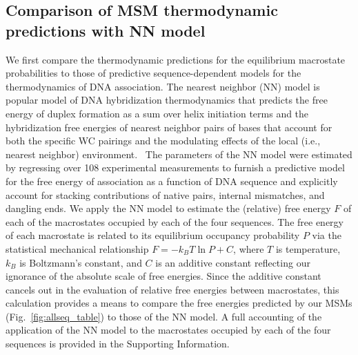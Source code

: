 \documentclass[journal=jpcbfk,manuscript=article]{achemso}
\begin{document}
\subsection{Comparison of MSM thermodynamic predictions with NN model} \label{sec:NN}

We first compare the thermodynamic predictions for the equilibrium macrostate probabilities to those of predictive sequence-dependent models for the thermodynamics of DNA association. The nearest neighbor (NN) model is popular model of DNA hybridization thermodynamics that predicts the free energy of duplex formation as a sum over helix initiation terms and the hybridization free energies of nearest neighbor pairs of bases that account for both the specific WC pairings and the modulating effects of the local (i.e., nearest neighbor) environment.~\citep{SantaLucia1998AThermodynamics, Santalucia2004TM} The parameters of the NN model were estimated by regressing over 108 experimental measurements to furnish a predictive model for the free energy of association as a function of DNA sequence and explicitly account for stacking contributions of native pairs, internal mismatches, and dangling ends. We apply the NN model to estimate the (relative) free energy $F$ of each of the macrostates occupied by each of the four sequences. The free energy of each macrostate is related to its equilibrium occupancy probability $P$ via the statistical mechanical relationship $F = -k_B T \ln P + C$, where $T$ is temperature, $k_B$ is Boltzmann's constant, and $C$ is an additive constant reflecting our ignorance of the absolute scale of free energies. Since the additive constant cancels out in the evaluation of relative free energies between macrostates, this calculation provides a means to compare the free energies predicted by our MSMs (Fig.~\ref{fig:allseq_table}) to those of the NN model. A full accounting of the application of the NN model to the macrostates occupied by each of the four sequences is provided in the Supporting Information.
\end{document}
